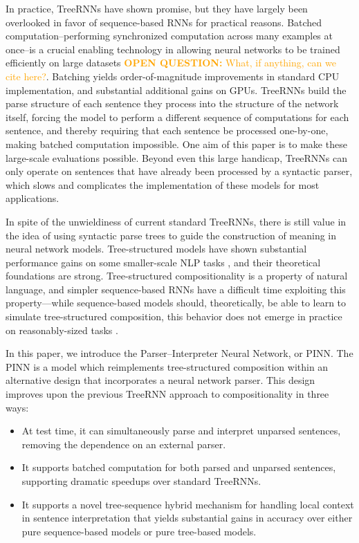 \documentclass[11pt,letterpaper]{article}
\newcommand\question[1]{\textcolor{orange}{\textbf{OPEN QUESTION:} #1}}
\begin{document}
In practice, TreeRNNs have shown promise, but they have largely been overlooked in favor of sequence-based RNNs for practical reasons. Batched computation--performing synchronized computation across many examples at once--is a crucial enabling technology in allowing neural networks to be trained efficiently on large datasets \question{What, if anything, can we cite here?}. Batching yields order-of-magnitude improvements in standard CPU implementation, and substantial additional gains on GPUs. TreeRNNs build the parse structure of each sentence they process into the structure of the network itself, forcing the model to perform a different sequence of computations for each sentence, and thereby requiring that each sentence be processed one-by-one, making batched computation impossible. One aim of this paper is to make these large-scale evaluations possible. Beyond even this large handicap, TreeRNNs can only operate on sentences that have already been processed by a syntactic parser, which slows and complicates the implementation of these models for most applications.

In spite of the unwieldiness of current standard TreeRNNs, there is still value in the idea of using syntactic parse trees to guide the construction of meaning in neural network models. Tree-structured models have shown substantial performance gains on some smaller-scale NLP tasks \cite{tai2015improved,li2015tree}, and their theoretical foundations are strong. Tree-structured compositionality is a property of natural language, and simpler sequence-based RNNs have a difficult time exploiting this property---while sequence-based models should, theoretically, be able to learn to simulate tree-structured composition, this behavior does not emerge in practice on reasonably-sized tasks \cite{bowman2015trees}. 

In this paper, we introduce the Parser--Interpreter Neural Network, or PINN. The PINN is a model which reimplements tree-structured composition within an alternative design that incorporates a neural network parser. This design improves upon the previous TreeRNN approach to compositionality in three ways:
\begin{itemize}
\item At test time, it can simultaneously parse and interpret unparsed sentences, removing the dependence on an external parser.
\item It supports batched computation for both parsed and unparsed sentences, supporting dramatic speedups over standard TreeRNNs.
\item It supports a novel tree-sequence hybrid mechanism for handling local context in sentence interpretation that yields substantial gains in accuracy over either pure sequence-based models or pure tree-based models.
\end{itemize}
\end{document}
